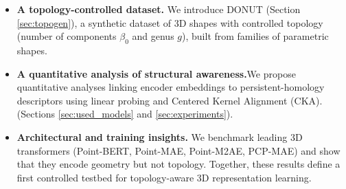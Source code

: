 \begin{itemize}
    \item \textbf{A topology-controlled dataset.} We introduce DONUT (Section \ref{sec:topogen}), a synthetic dataset of 3D shapes with controlled topology (number of components $\beta_0$ and genus $g$), built from families of parametric shapes.
    \item \textbf{A quantitative analysis of structural awareness.}We propose quantitative analyses linking encoder embeddings to persistent-homology descriptors using linear probing and Centered Kernel Alignment (CKA). (Sections \ref{sec:used_models} and \ref{sec:experiments}).
    \item \textbf{Architectural and training insights.} We benchmark leading 3D transformers (Point-BERT, Point-MAE, Point-M2AE, PCP-MAE) and show that they encode geometry but not topology. Together, these results define a first controlled testbed for topology-aware 3D representation learning.
\end{itemize}